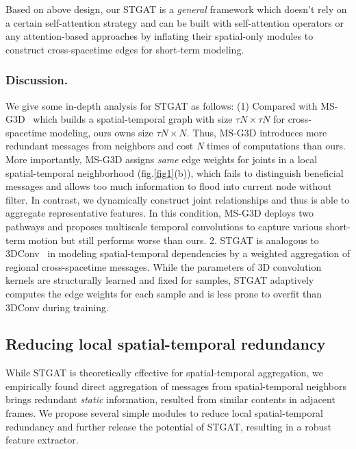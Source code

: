 \documentclass[runningheads]{llncs}
\begin{document}
Based on above design, our STGAT is a \textit{general} framework which doesn't rely on a certain self-attention strategy and can be built with self-attention operators or any attention-based approaches by inflating their spatial-only modules to construct cross-spacetime edges for short-term modeling. 
 
\subsubsection{Discussion.}
We give some in-depth analysis for STGAT as follows: (1) Compared with MS-G3D~\cite{liu2020disentangling} which builds a spatial-temporal graph with size $\tau N \times \tau N$ for cross-spacetime modeling, ours owns size $\tau N \times N$. Thus, MS-G3D introduces more redundant messages from neighbors and cost \textit{N} times of computations than ours. More importantly, MS-G3D assigns \textit{same} edge weights for joints in a local spatial-temporal neighborhood (fig.\ref{fig1}(b)), which fails to distinguish beneficial messages and allows too much information to flood into current node without filter. In contrast, we dynamically construct joint relationships and thus is able to aggregate representative features. In this condition, MS-G3D deploys two pathways and proposes multiscale temporal convolutions to capture various short-term motion but still performs worse than ours. 2. STGAT is analogous to 3DConv~\cite{tran2015learning,carreira2017quo} in modeling spatial-temporal dependencies by a weighted aggregation of regional cross-spacetime messages. While the parameters of 3D convolution kernels are structurally learned and fixed for samples, STGAT adaptively computes the edge weights for each sample and is less prone to overfit than 3DConv during training. 
  
\subsection{Reducing local spatial-temporal redundancy}
While STGAT is theoretically effective for spatial-temporal aggregation, we empirically found direct aggregation of messages from spatial-temporal neighbors brings redundant \textit{static} information, resulted from similar contents in adjacent frames. 
We propose several simple modules to reduce local spatial-temporal redundancy and further release the potential of STGAT, resulting in a robust feature extractor.
\end{document}
